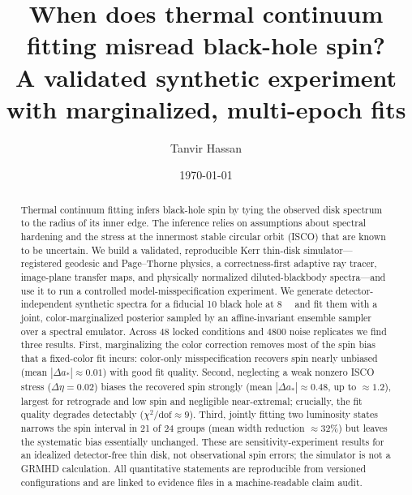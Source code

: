 \documentclass[aip,reprint,amsmath,amssymb]{revtex4-2}
\begin{document}
\title{When does thermal continuum fitting misread black-hole spin?\\
A validated synthetic experiment with marginalized, multi-epoch fits}

\author{Tanvir Hassan}

\date{\today}

\begin{abstract}
Thermal continuum fitting infers black-hole spin by tying the observed disk
spectrum to the radius of its inner edge. The inference relies on assumptions
about spectral hardening and the stress at the innermost stable circular orbit
(ISCO) that are known to be uncertain. We build a validated, reproducible
Kerr thin-disk simulator---registered geodesic and Page--Thorne physics, a
correctness-first adaptive ray tracer, image-plane transfer maps, and physically
normalized diluted-blackbody spectra---and use it to run a controlled
model-misspecification experiment. We generate detector-independent synthetic
spectra for a fiducial \SI{10}{\Msun} black hole at \SI{8}{\kilo\parsec} and fit them with
a joint, color-marginalized posterior sampled by an affine-invariant ensemble
sampler over a spectral emulator. Across 48 locked conditions and 4800 noise
replicates we find three results. First, marginalizing the color correction
removes most of the spin bias that a fixed-color fit incurs: color-only
misspecification recovers spin nearly unbiased (mean $|\Delta a_\ast|\approx
0.01$) with good fit quality. Second, neglecting a weak nonzero ISCO stress
($\Delta\eta=0.02$) biases the recovered spin strongly (mean $|\Delta
a_\ast|\approx 0.48$, up to $\approx 1.2$), largest for retrograde and low spin
and negligible near-extremal; crucially, the fit quality degrades detectably
($\chi^2/\mathrm{dof}\approx 9$). Third, jointly fitting two luminosity states
narrows the spin interval in 21 of 24 groups (mean width reduction $\approx
32\%$) but leaves the systematic bias essentially unchanged. These are
sensitivity-experiment results for an idealized detector-free thin disk, not
observational spin errors; the simulator is not a GRMHD calculation. All
quantitative statements are reproducible from versioned configurations and are
linked to evidence files in a machine-readable claim audit.
\end{abstract}

\maketitle
\end{document}
